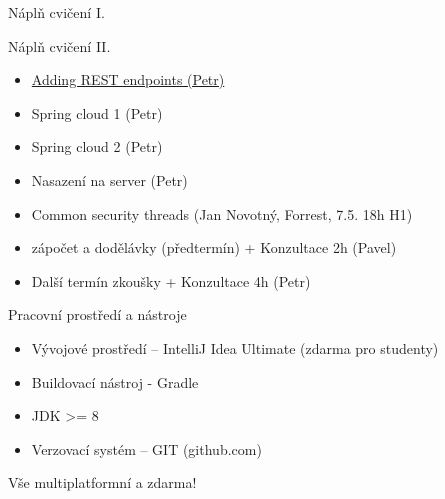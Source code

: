 \documentclass{beamer}
\begin{document}
  
\begin{frame}{Náplň cvičení I.}
\end{frame}  
\begin{frame}{Náplň cvičení II.}
		\begin{itemize}
			\item 
			\href{http://www.vogella.com/tutorials/SpringBoot/article.html#exercise-making-the-information-available-via-rest}{Adding REST endpoints (Petr)}
			\item  Spring cloud 1 (Petr)
			\item  Spring cloud 2 (Petr)
			\item  Nasazení na server (Petr)
			\item  Common security threads (Jan Novotný, Forrest, 7.5. 18h H1)			
			\item  zápočet a dodělávky (předtermín) + Konzultace 2h (Pavel) 
			\item  Další termín zkoušky + Konzultace 4h (Petr)
		\end{itemize}
\end{frame}  
  



\begin{frame}{Pracovní prostředí a nástroje}
	\begin{itemize}
		\item Vývojové prostředí -- IntelliJ Idea Ultimate (zdarma pro studenty)
		\item Buildovací nástroj - Gradle  
		\item JDK >= 8
		\item Verzovací systém -- GIT (github.com)
	\end{itemize}
	
	Vše multiplatformní a zdarma!
\end{frame}
\end{document}
